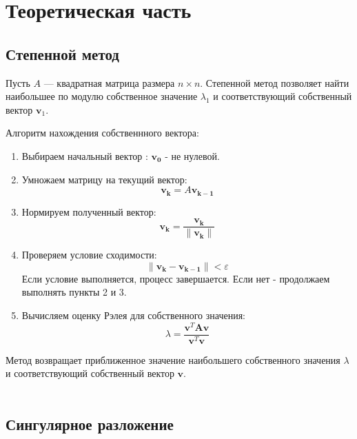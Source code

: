 \documentclass[a4paper, 12pt]{report}
\begin{document}
\chapter*{Теоретическая часть}
\setcounter{chapter}{2}
\setcounter{section}{0}

\section{Степенной метод}

Пусть \( A \) — квадратная матрица размера \( n \times n \). Степенной метод позволяет найти наибольшее по модулю собственное значение \( \lambda_1 \) и соответствующий собственный вектор \( \mathbf{v}_1 \).


{Алгоритм нахождения собственнного вектора:} 

\begin{enumerate}
    \item Выбираем начальный вектор : \(\mathbf{v_0}\) - не нулевой. 
   
    \item Умножаем матрицу на текущий вектор:
    \[
    \mathbf{v_k} = A\mathbf{v_{k-1}}
    \]
    \item Нормируем полученный вектор:
    \[
    \mathbf{v_k} = \frac{\mathbf{v_k}}{\|\mathbf{v_k}\|}
    \]
    \item Проверяем условие сходимости:
    \[
    \|\mathbf{v_k} - \mathbf{v_{k-1}}\| < \varepsilon
    \]
    Если условие выполняется, процесс завершается. Если нет - продолжаем выполнять пункты 2 и 3.

    \item Вычисляем оценку Рэлея для собственного значения:
    \[
    \lambda = \frac{\mathbf{v}^T\mathbf{A}\mathbf{v}}{\mathbf{v}^T\mathbf{v}}
    \]
    
\end{enumerate}



Метод возвращает приближенное значение наибольшего собственного значения $\lambda$ и соответствующий собственный вектор $\mathbf{v}$. \\
\\

\section{Сингулярное разложение}

\begingroup
\renewcommand{\labelitemi}{\labelitemiv}
\end{document}
